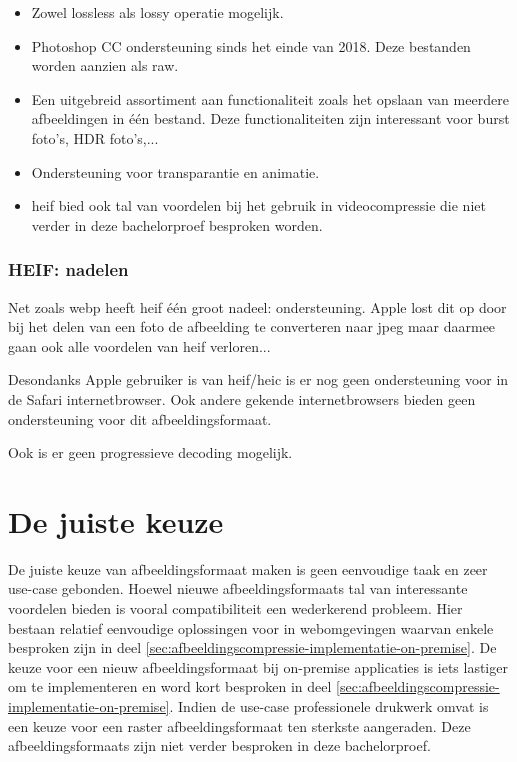 \begin{itemize}
	\item Zowel \gls{lossless} als \gls{lossy} operatie mogelijk.
	
	\item Photoshop CC ondersteuning sinds het einde van 2018. Deze bestanden worden aanzien als \gls{raw}.
	
	\item Een uitgebreid assortiment aan functionaliteit zoals het opslaan van meerdere afbeeldingen in één bestand. Deze functionaliteiten zijn interessant voor burst foto's, HDR foto's,...
	
	\item Ondersteuning voor transparantie en animatie.
	
	\item \Gls{heif} bied ook tal van voordelen bij het gebruik in \gls{videocompressie} die niet verder in deze bachelorproef besproken worden.
\end{itemize}

\subsubsection{HEIF: nadelen}
\label{sec:afbeeldingscompressie-heif-nadelen}

Net zoals \gls{webp} heeft \gls{heif} één groot nadeel: ondersteuning. Apple lost dit op door bij het delen van een foto de afbeelding te converteren naar \gls{jpeg} maar daarmee gaan ook alle voordelen van \gls{heif} verloren... 

Desondanks Apple gebruiker is van \gls{heif}/\gls{heic} is er nog geen ondersteuning voor in de Safari internetbrowser. Ook andere gekende internetbrowsers bieden geen ondersteuning voor dit \gls{afbeeldingsformaat}.

Ook is er geen progressieve \gls{decoding} mogelijk.

\section{De juiste keuze}
\label{sec:afbeeldingscompressie-keuze}

De juiste keuze van \gls{afbeeldingsformaat} maken is geen eenvoudige taak en zeer \gls{use-case} gebonden. Hoewel nieuwe \glspl{afbeeldingsformaat} tal van interessante voordelen bieden is vooral compatibiliteit een wederkerend probleem. Hier bestaan relatief eenvoudige oplossingen voor in webomgevingen waarvan enkele besproken zijn in deel \ref{sec:afbeeldingscompressie-implementatie-on-premise}. De keuze voor een nieuw \gls{afbeeldingsformaat} bij \gls{on-premise} applicaties is iets lastiger om te implementeren en word kort besproken in deel \ref{sec:afbeeldingscompressie-implementatie-on-premise}. Indien de \gls{use-case} professionele drukwerk omvat is een keuze voor een \gls{raster} \gls{afbeeldingsformaat} ten sterkste aangeraden. Deze \glspl{afbeeldingsformaat} zijn niet verder besproken in deze bachelorproef.


